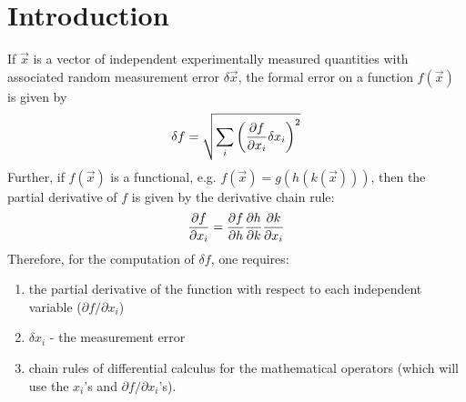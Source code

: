 \documentclass[12pt]{article}
\begin{document}
\newpage
\tableofcontents
\newpage
            
            
            
            

\section{Introduction}

If $\vec x$ is a vector of independent experimentally measured
quantities with associated random measurement error $\delta \vec
x$, the formal error on a function $f(\vec x)$ is given by
\begin{equation}
  \delta f = \sqrt{\sum_i {\left( {\partial f \over {\partial x_i}} 
        \delta x_i \right)}^2}
\label{FERR}
\end{equation}
Further, if $f(\vec x)$ is a functional, e.g. $f(\vec x)=g(h(k(\vec
x)))$, then the partial derivative of $f$ is given by the derivative
chain rule:
\begin{equation}
{\partial f \over \partial x_i} = {\partial f \over \partial h} 
{\partial h \over \partial k} {\partial k \over \partial x_i}
\label{DFUNCTIONAL}
\end{equation}
Therefore, for the computation of $\delta f$, one requires:
\begin{enumerate}
\item the partial derivative of the function with respect to each
independent variable ($\partial f / \partial x_i$)
\item $\delta x_i$ - the measurement error
\item chain rules of differential calculus for the
mathematical operators (which will use the $x_i$'s and $\partial f /
\partial x_i$'s).  
\end{enumerate}
\end{document}
